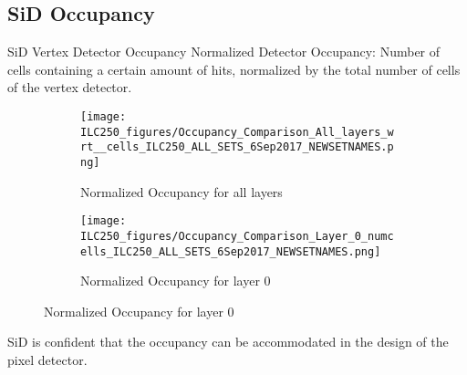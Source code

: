 \documentclass[xcolor={dvipsnames}]{beamer}
\begin{document}
\subsection{SiD Occupancy}
\begin{frame}{SiD Vertex Detector Occupancy}
 Normalized Detector Occupancy: Number of cells containing a certain amount of hits, normalized by the total number of cells of the vertex detector.
 \begin{figure}
\centering
\begin{subfigure}[t]{0.48\textwidth}
\centering
\texttt{[image: ILC250\_figures/Occupancy\_Comparison\_All\_layers\_wrt\_\_cells\_ILC250\_ALL\_SETS\_6Sep2017\_NEWSETNAMES.png]}
\caption{\alert{Normalized Occupancy for all layers}}
\end{subfigure}
\hspace*{0.2cm}
\begin{subfigure}[t]{0.48\textwidth}
\centering
\texttt{[image: ILC250\_figures/Occupancy\_Comparison\_Layer\_0\_numcells\_ILC250\_ALL\_SETS\_6Sep2017\_NEWSETNAMES.png]}
\caption{\alert{Normalized Occupancy for layer 0}}
\end{subfigure}
\end{figure}
SiD is confident that the occupancy can be accommodated in the design of the pixel detector.
\end{frame}
\end{document}
